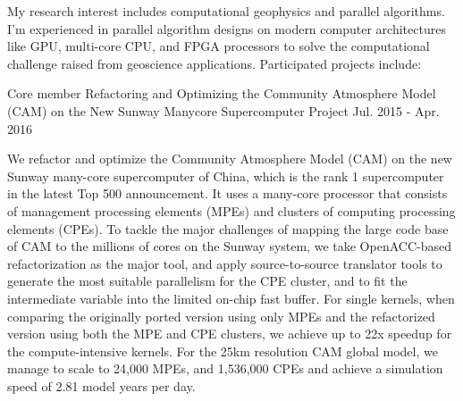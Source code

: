 \documentclass[11pt, a4paper]{awesome-cv}
\begin{document}
\begin{cvparagraph}
My research interest includes computational geophysics and parallel algorithms. I'm experienced in parallel algorithm designs on modern computer architectures like GPU, multi-core CPU, and FPGA processors to solve the computational challenge raised from geoscience applications. Participated projects include:
\end{cvparagraph}

\begin{cventries}

  \cventry
    {Core member} %
    {Refactoring and Optimizing the Community Atmosphere Model (CAM) on the New Sunway Manycore Supercomputer} %
    {Project} %
    {Jul. 2015 - Apr. 2016} %
    {
      \begin{cvitems} %
        \item {We refactor and optimize the Community Atmosphere Model (CAM) on the new Sunway many-core supercomputer of China, which is the rank 1 supercomputer in the latest Top 500 announcement. It uses a many-core processor that consists of management processing elements (MPEs) and clusters of computing processing elements (CPEs). To tackle the major challenges of mapping the large code base of CAM to the millions of cores on the Sunway system, we take OpenACC-based refactorization as the major tool, and apply source-to-source translator tools to generate the most suitable parallelism for the CPE cluster, and to fit the intermediate variable into the limited on-chip fast buffer. For single kernels, when comparing the originally ported version using only MPEs and the refactorized version using both the MPE and CPE clusters, we achieve up to 22x speedup for the compute-intensive kernels. For the 25km resolution CAM global model, we manage to scale to 24,000 MPEs, and 1,536,000 CPEs and achieve a simulation speed of 2.81 model years per day.}
      \end{cvitems}
    }


\end{cventries}
\end{document}
